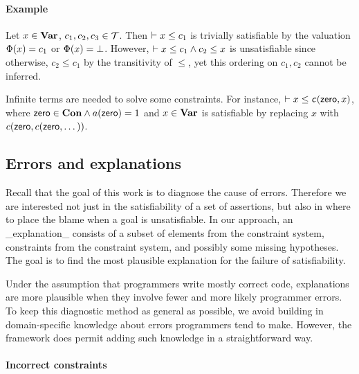 \paragraph{Example}

Let $x\in \mathbf{Var}$, $c_1, c_2, c_3\in \mathcal{T}$. Then $\vdash x \leq c_1$ is
trivially satisfiable by the valuation $\Phi(x)=c_1$ or
$\Phi(x)=\bot$. However, $\vdash x \leq c_1 \land c_2 \leq x$ is
unsatisfiable since otherwise, $c_2 \leq c_1$ by the transitivity of
$\leq$, yet this ordering on $c_1, c_2$ cannot be inferred.

Infinite terms are needed to solve some constraints. For instance,
$\vdash x \leq \textsf{\textit{c}}(\textsf{zero}, x)$, where $\textsf{zero}
\in \mathbf{Con} \land a(\textsf{zero})=1$ and $x\in \mathbf{Var}$ is satisfiable
by replacing $x$ with $c(\textsf{zero}, c(\textsf{zero}, \dots))$.


\subsection{Errors and explanations}

Recall that the goal of this work is to diagnose the cause of errors.
Therefore we are interested not just in the satisfiability of a
set of assertions, but also in where to place the blame when
a goal is unsatisfiable. In our approach,
an _explanation_ consists of a subset of elements from the constraint
system, constraints from the constraint system, and possibly some
missing hypotheses. The goal is to find the most plausible
explanation for the failure of satisfiability. 

Under the assumption that programmers write mostly correct code,
explanations are more plausible when they involve fewer and more
likely programmer errors. To keep this diagnostic method as general as
possible, we avoid building in domain-specific knowledge about
errors programmers tend to make.  However, the framework does
permit adding such knowledge in a straightforward way.


\paragraph{Incorrect constraints}

